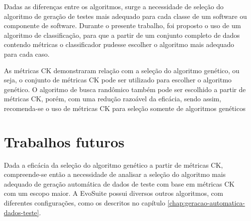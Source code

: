 \documentclass[
	12pt,				%
	oneside,			%
	a4paper,			%
	english,			%
	brazil				%
	]{abntex2ppgsi}
\begin{document}
Dadas as diferenças entre os algoritmos, surge a necessidade de seleção do algoritmo  de geração de testes mais adequado para cada classe de um software ou componente de software. Durante o presente trabalho, foi proposto o uso de um algoritmo de classificação, para que a partir de um conjunto completo de dados contendo métricas o classificador pudesse escolher o algoritmo mais adequado para cada caso.

As métricas CK demonstraram relação com a seleção do algoritmo genético, ou seja, o conjunto de métricas CK pode ser utilizado para escolher o algoritmo genético.  O algoritmo de busca randômico também pode ser escolhido a partir de métricas CK, porém, com uma redução razoável da eficácia, sendo assim, recomenda-se o uso de métricas CK para seleção somente de algoritmos genéticos

\section{Trabalhos futuros}
Dada a eficácia da seleção do algoritmo genético a partir de métricas CK, compreende-se então a necessidade de analisar a seleção do algoritmo mais adequado de geração automática de dados de teste com base em métricas CK com um escopo maior. A EvoSuite possui diversos outros algoritmos, com diferentes configurações, como os descritos no capítulo \ref{chap:geracao-automatica-dados-teste}.


\postextual



%
%

\end{document}
